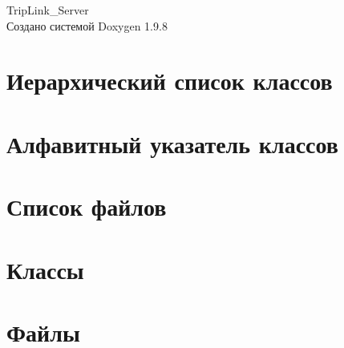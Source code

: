 \documentclass[twoside]{book}
\newcommand{\+}{\discretionary{\mbox{\scriptsize$\hookleftarrow$}}{}{}}
\newcommand{\clearemptydoublepage}{%
    \newpage{\pagestyle{empty}\cleardoublepage}%
  }
\begin{document}
  \raggedbottom
    \hypersetup{pageanchor=false,
                bookmarksnumbered=true,
                pdfencoding=unicode
               }
  \begin{titlepage}
  \vspace*{7cm}
  \begin{center}%
  {\Large Trip\+Link\+\_\+\+Server}\\
  \vspace*{1cm}
  {\large Создано системой Doxygen 1.9.8}\\
  \end{center}
  \end{titlepage}
  \clearemptydoublepage
  \tableofcontents
  \clearemptydoublepage
  \hypersetup{pageanchor=true}
\chapter{Иерархический список классов}

\chapter{Алфавитный указатель классов}

\chapter{Список файлов}

\chapter{Классы}



\chapter{Файлы}










  \backmatter
  \newpage
  \clearemptydoublepage
  \printindex
\end{document}
